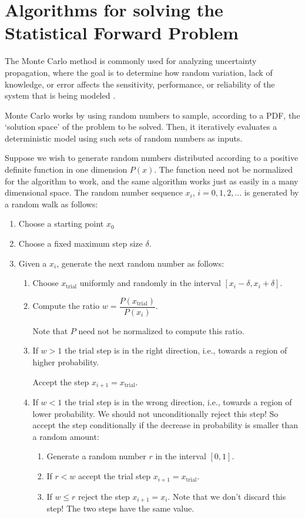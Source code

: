 \section{Algorithms for solving the Statistical Forward Problem}

The Monte Carlo method is commonly used for analyzing uncertainty propagation,
where the goal is to determine how random variation, lack of knowledge, or
error affects the sensitivity, performance, or reliability of the system that
is being modeled \cite{RoCa04}.

Monte Carlo works by using random numbers to sample, according to a PDF, the
`solution space' of the problem to be solved.  Then, it iteratively evaluates a
deterministic model using such sets of random numbers as inputs.

Suppose we wish to generate random numbers distributed according to a positive
definite function in one dimension $P(x)$.  The function need not be normalized
for the algorithm to work, and the same algorithm works just as easily in a
many dimensional space. The random number sequence $x_i$, $i=0,1,2,\ldots$ is
generated by a random walk as follows:

\begin{enumerate}
\item Choose a starting point $x_0$
\item Choose a fixed maximum step size $\delta$.
\item Given a $x_i$,  generate the next random number as follows: 
  \begin{enumerate}
  \item Choose $x_\text{trial}$  uniformly and randomly in the interval $[x_i-\delta, x_i+\delta]$.
  \item Compute the ratio $w=\dfrac{P(x_\text{trial})}{P(x_i)}$.
 
   Note that $P$ need not be normalized to compute this ratio.
  
  \item If $w >1$ the trial step is in the  right direction, i.e., towards a region of higher probability. 
  
  Accept the step $x_{i+1} =x_\text{trial}$.
  
  \item  If $w <1$ the trial step is in the wrong direction, i.e., towards a region of lower probability.  We should not unconditionally reject this step! So accept the step conditionally if the decrease in probability is smaller than a random amount:
     \begin{enumerate}
     \item Generate a random number $r$ in the interval $[0,1]$.
     \item If $r < w$ accept the trial step $x_{i+1} = x_\text{trial}$.
     \item If $w \leq r $ reject the step $x_{i+1}=x_i$. Note that we don't discard this step! The two steps have the same value.
     \end{enumerate}
  \end{enumerate}
\end{enumerate}

